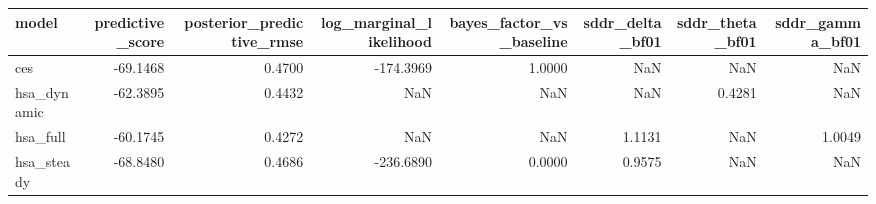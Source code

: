 \begin{tabular}{lrrrrrrr}
\toprule
model & predictive\_score & posterior\_predictive\_rmse & log\_marginal\_likelihood & bayes\_factor\_vs\_baseline & sddr\_delta\_bf01 & sddr\_theta\_bf01 & sddr\_gamma\_bf01 \\
\midrule
ces & -69.1468 & 0.4700 & -174.3969 & 1.0000 & NaN & NaN & NaN \\
hsa\_dynamic & -62.3895 & 0.4432 & NaN & NaN & NaN & 0.4281 & NaN \\
hsa\_full & -60.1745 & 0.4272 & NaN & NaN & 1.1131 & NaN & 1.0049 \\
hsa\_steady & -68.8480 & 0.4686 & -236.6890 & 0.0000 & 0.9575 & NaN & NaN \\
\bottomrule
\end{tabular}
